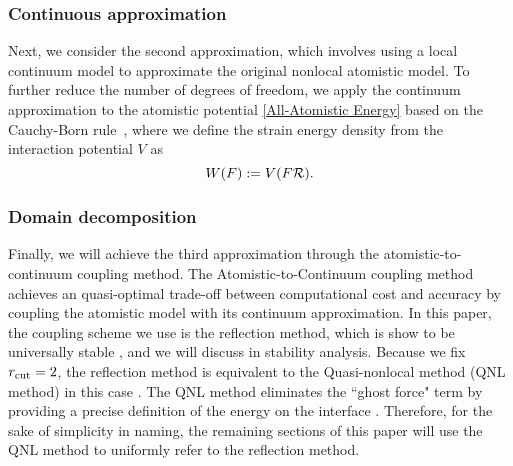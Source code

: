 	
	
	
	
	\subsubsection{Continuous approximation}
	
	Next, we consider the second approximation, which involves using a local continuum model to approximate the original nonlocal atomistic model. To further reduce the number of degrees of freedom, we apply the continuum approximation to the atomistic potential \eqref{All-Atomistic Energy} based on the Cauchy-Born rule~\cite{2013_CO_FT_Cauchy_Born_ARMA}, where we define the strain energy density from the interaction potential $V$ as 
	\begin{equation}
		\label{Cauchy-Born site energy}
		W(F) := V(F\mathcal{R}).
	\end{equation}
	
	
	\subsubsection{Domain decomposition}
	
	Finally, we will achieve the third approximation through the atomistic-to-continuum coupling method. The Atomistic-to-Continuum coupling method achieves an quasi-optimal trade-off between computational cost and accuracy by coupling the atomistic model with its continuum approximation. In this paper, the coupling scheme we use is the reflection method, which is show to be universally stable  \cite{2014_CO_AS_LZ_Stabilization_MMS}, and we will discuss in stability analysis. Because we fix $r_{{\rm cut}} = 2$, the reflection method is equivalent to the Quasi-nonlocal method (QNL method) in this case \cite{2013_ML_CO_AC_Coupling_ACTANUM}. The QNL method eliminates the ``ghost force" term by providing a precise definition of the energy on the interface \cite{2011_CO_1D_QNL_MATHCOMP}. Therefore, for the sake of simplicity in naming, the remaining sections of this paper will use the QNL method to uniformly refer to the reflection method.
	
